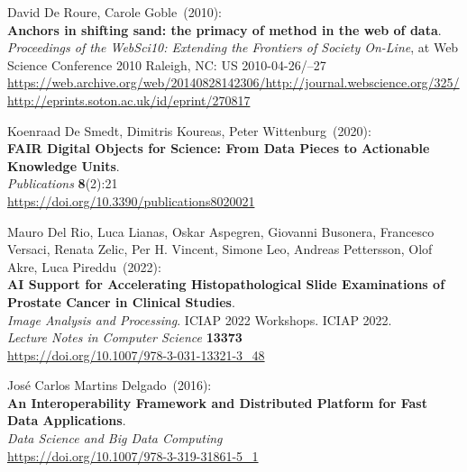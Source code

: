 \begin{thebibliography}{9}
David De Roure, Carole Goble~(2010): \\
\textbf{Anchors in shifting sand: the primacy of method in the web of data}. \\
\emph{Proceedings of the WebSci10: Extending the Frontiers of Society On-Line},
at Web Science Conference 2010 Raleigh, NC: US 2010-04-26/--27\\
\url{https://web.archive.org/web/20140828142306/http://journal.webscience.org/325/}\\
\url{http://eprints.soton.ac.uk/id/eprint/270817} 

Koenraad De Smedt, Dimitris Koureas, Peter Wittenburg~(2020): \\
\textbf{FAIR Digital Objects for Science: From Data Pieces to Actionable Knowledge Units}.\\
\emph{Publications} \textbf{8}(2):21\\
\url{https://doi.org/10.3390/publications8020021}


Mauro Del Rio, Luca Lianas, Oskar Aspegren, Giovanni Busonera, Francesco Versaci, Renata Zelic, Per H. Vincent, Simone Leo, Andreas Pettersson, Olof Akre, Luca Pireddu~(2022): \\
\textbf{AI Support for Accelerating Histopathological Slide Examinations of Prostate Cancer in Clinical Studies}.\\
\emph{Image Analysis and Processing}. ICIAP 2022 Workshops. ICIAP 2022. \\
\emph{Lecture Notes in Computer Science} \textbf{13373}\\
\url{https://doi.org/10.1007/978-3-031-13321-3_48}

José Carlos Martins Delgado~(2016): \\
\textbf{An Interoperability Framework and Distributed Platform for Fast Data Applications}.\\
\emph{Data Science and Big Data Computing} \\
\url{https://doi.org/10.1007/978-3-319-31861-5_1}


\end{thebibliography}
